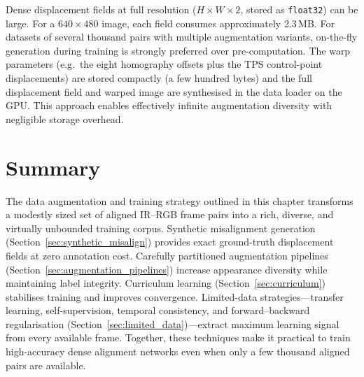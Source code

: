Dense displacement fields at full resolution ($H \times W \times 2$, stored as
\texttt{float32}) can be large.  For a $640 \times 480$ image, each field
consumes approximately 2.3\,MB.  For datasets of several thousand pairs with
multiple augmentation variants, on-the-fly generation during training is
strongly preferred over pre-computation.  The warp parameters (e.g.\ the
eight homography offsets plus the TPS control-point displacements) are stored
compactly (a few hundred bytes) and the full displacement field and warped
image are synthesised in the data loader on the GPU.  This approach enables
effectively infinite augmentation diversity with negligible storage overhead.


\section{Summary}
\label{sec:augmentation_summary}

The data augmentation and training strategy outlined in this chapter
transforms a modestly sized set of aligned IR--RGB frame pairs into a rich,
diverse, and virtually unbounded training corpus.  Synthetic misalignment
generation (Section~\ref{sec:synthetic_misalign}) provides exact ground-truth
displacement fields at zero annotation cost.  Carefully partitioned
augmentation pipelines (Section~\ref{sec:augmentation_pipelines}) increase
appearance diversity while maintaining label integrity.  Curriculum learning
(Section~\ref{sec:curriculum}) stabilises training and improves convergence.
Limited-data strategies---transfer learning, self-supervision, temporal
consistency, and forward--backward regularisation
(Section~\ref{sec:limited_data})---extract maximum learning signal from every
available frame.  Together, these techniques make it practical to train
high-accuracy dense alignment networks even when only a few thousand aligned
pairs are available.
